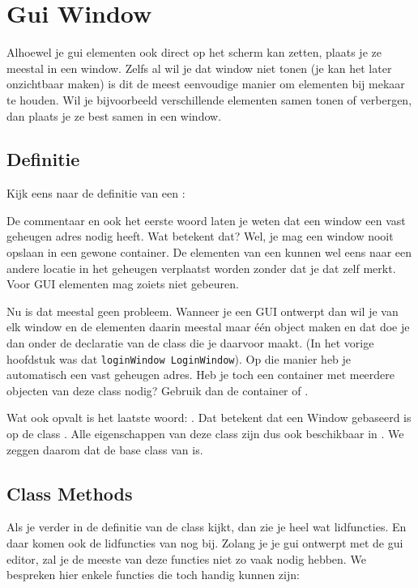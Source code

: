 \chapter{Gui Window}
Alhoewel je gui elementen ook direct op het scherm kan zetten, plaats je ze meestal in een window. Zelfs al wil je dat window niet tonen (je kan het later onzichtbaar maken) is dit de meest eenvoudige manier om elementen bij mekaar te houden. Wil je bijvoorbeeld verschillende elementen samen tonen of verbergen, dan plaats je ze best samen in een window.

\section{Definitie}
Kijk eens naar de definitie van een :

\begin{code}
const_mem_addr struct Window : GuiObj // Gui Window !! must be stored in constant memory address !!
{
   Byte      flag       ,
   ...
\end{code}

De commentaar en ook het eerste woord  laten je weten dat een window een vast geheugen adres nodig heeft. Wat betekent dat? Wel, je mag een window nooit opslaan in een gewone container. De elementen van een  kunnen wel eens naar een andere locatie in het geheugen verplaatst worden zonder dat je dat zelf merkt. Voor GUI elementen mag zoiets niet gebeuren.

Nu is dat meestal geen probleem. Wanneer je een GUI ontwerpt dan wil je van elk window en de elementen daarin meestal maar \'e\'en object maken en dat doe je dan onder de declaratie van de class die je daarvoor maakt. (In het vorige hoofdstuk was dat \verb|loginWindow LoginWindow|). Op die manier heb je automatisch een vast geheugen adres. Heb je toch een container met meerdere objecten van deze class nodig? Gebruik dan de container  of .

Wat ook opvalt is het laatste woord: . Dat betekent dat een Window gebaseerd is op de class . Alle eigenschappen van deze class zijn dus ook beschikbaar in . We zeggen daarom dat  de base class van  is.

\section{Class Methods}
Als je verder in de definitie van de class  kijkt, dan zie je heel wat lidfuncties. En daar komen ook de lidfuncties van  nog bij. Zolang je je gui ontwerpt met de gui editor, zal je de meeste van deze functies niet zo vaak nodig hebben. We bespreken hier enkele functies die toch handig kunnen zijn:

